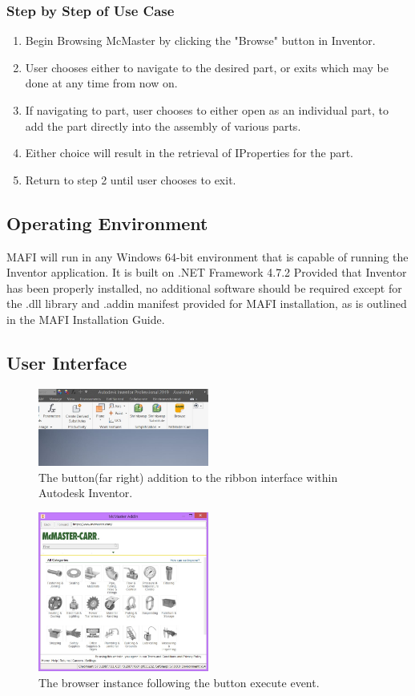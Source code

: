 \documentclass[12pt, letterpaper]{article}
\begin{document}
\subsubsection{Step by Step of Use Case}
\begin{enumerate}
    \item Begin Browsing McMaster by clicking the "Browse" button in Inventor.
    \item User chooses either to navigate to the desired part, or exits which may be done at any time from now on.
    \item If navigating to part, user chooses to either open as an individual part, to add the part directly into the assembly of various parts.
    \item Either choice will result in the retrieval of IProperties for the part.
    \item Return to step 2 until user chooses to exit.
\end{enumerate}

\subsection{Operating Environment}
MAFI will run in any Windows 64-bit environment that is capable of running the Inventor application. It is built on .NET Framework 4.7.2 Provided that Inventor has been properly installed, no additional software should be required except for the .dll library and .addin manifest provided for MAFI installation, as is outlined in the MAFI Installation Guide.
\subsection{User Interface}
\begin{figure}[H]
    \centering
    \includegraphics[width=0.5\textwidth]{Figures/mcMasterButton.JPG}
    \caption{The button(far right) addition to the ribbon interface within Autodesk Inventor.}
\end{figure}
\begin{figure}[H]
    \centering
    \includegraphics[width=0.5\textwidth]{Figures/webBrowserView.jpg}
    \caption{The browser instance following the button execute event.}
\end{figure}
\end{document}
